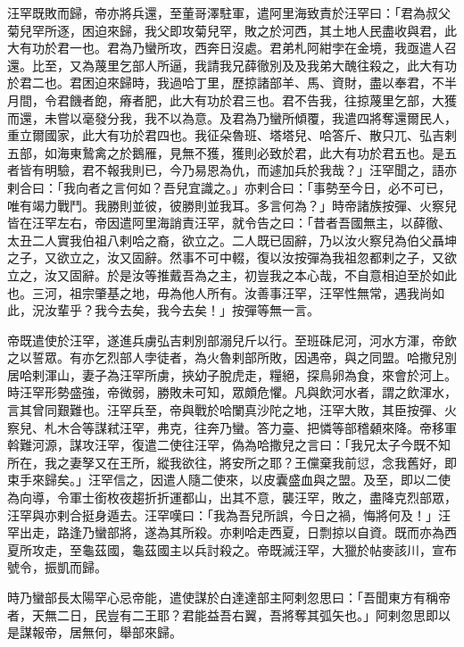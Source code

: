 \begin{pinyinscope}
 汪罕既敗而歸，帝亦將兵還，至董哥澤駐軍，遣阿里海致責於汪罕曰：「君為叔父菊兒罕所逐，困迫來歸，我父即攻菊兒罕，敗之於河西，其土地人民盡收與君，此大有功於君一也。君為乃蠻所攻，西奔日沒處。君弟札阿紺孛在金境，我亟遣人召還。比至，又為蔑里乞部人所逼，我請我兄薛徹別及及我弟大醜往殺之，此大有功於君二也。君困迫來歸時，我過哈丁里，歷掠諸部羊、馬、資財，盡以奉君，不半月間，令君饑者飽，瘠者肥，此大有功於君三也。君不告我，往掠蔑里乞部，大獲而還，未嘗以毫發分我，我不以為意。及君為乃蠻所傾覆，我遣四將奪還爾民人，重立爾國家，此大有功於君四也。我征朵魯班、塔塔兒、哈答斤、散只兀、弘吉剌五部，如海東鷙禽之於鵝雁，見無不獲，獲則必致於君，此大有功於君五也。是五者皆有明驗，君不報我則已，今乃易恩為仇，而遽加兵於我哉？」汪罕聞之，語亦剌合曰：「我向者之言何如？吾兒宜識之。」亦剌合曰：「事勢至今日，必不可已，唯有竭力戰鬥。我勝則並彼，彼勝則並我耳。多言何為？」時帝諸族按彈、火察兒皆在汪罕左右，帝因遣阿里海誚責汪罕，就令告之曰：「昔者吾國無主，以薛徹、太丑二人實我伯祖八剌哈之裔，欲立之。二人既已固辭，乃以汝火察兒為伯父聶坤之子，又欲立之，汝又固辭。然事不可中輟，復以汝按彈為我祖忽都剌之子，又欲立之，汝又固辭。於是汝等推戴吾為之主，初豈我之本心哉，不自意相迫至於如此也。三河，祖宗肇基之地，毋為他人所有。汝善事汪罕，汪罕性無常，遇我尚如此，況汝輩乎？我今去矣，我今去矣！」按彈等無一言。



 帝既遣使於汪罕，遂進兵虜弘吉剌別部溺兒斤以行。至班硃尼河，河水方渾，帝飲之以誓眾。有亦乞烈部人孛徒者，為火魯剌部所敗，因遇帝，與之同盟。哈撒兒別居哈剌渾山，妻子為汪罕所虜，挾幼子脫虎走，糧絕，探鳥卵為食，來會於河上。時汪罕形勢盛強，帝微弱，勝敗未可知，眾頗危懼。凡與飲河水者，謂之飲渾水，言其曾同艱難也。汪罕兵至，帝與戰於哈闌真沙陀之地，汪罕大敗，其臣按彈、火察兒、札木合等謀弒汪罕，弗克，往奔乃蠻。答力臺、把憐等部稽顙來降。帝移軍斡難河源，謀攻汪罕，復遣二使往汪罕，偽為哈撒兒之言曰：「我兄太子今既不知所在，我之妻孥又在王所，縱我欲往，將安所之耶？王儻棄我前愆，念我舊好，即束手來歸矣。」汪罕信之，因遣人隨二使來，以皮囊盛血與之盟。及至，即以二使為向導，令軍士銜枚夜趨折折運都山，出其不意，襲汪罕，敗之，盡降克烈部眾，汪罕與亦剌合挺身遁去。汪罕嘆曰：「我為吾兒所誤，今日之禍，悔將何及！」汪罕出走，路逢乃蠻部將，遂為其所殺。亦剌哈走西夏，日剽掠以自資。既而亦為西夏所攻走，至龜茲國，龜茲國主以兵討殺之。帝既滅汪罕，大獵於帖麥該川，宣布號令，振凱而歸。



 時乃蠻部長太陽罕心忌帝能，遣使謀於白達達部主阿剌忽思曰：「吾聞東方有稱帝者，天無二日，民豈有二王耶？君能益吾右翼，吾將奪其弧矢也。」阿剌忽思即以是謀報帝，居無何，舉部來歸。




\end{pinyinscope}

